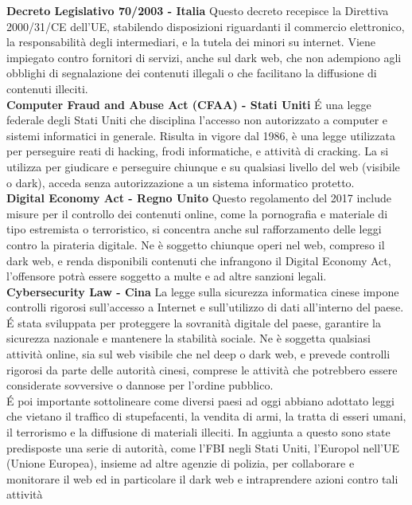 \textbf{Decreto Legislativo 70/2003 - Italia}
Questo decreto recepisce la Direttiva 2000/31/CE dell'UE, stabilendo disposizioni riguardanti il commercio elettronico, la responsabilità degli intermediari, e la tutela dei minori su internet.
Viene impiegato contro fornitori di servizi, anche sul dark web, che non adempiono agli obblighi di segnalazione dei contenuti illegali o che facilitano la diffusione di contenuti illeciti.\\

\textbf{Computer Fraud and Abuse Act (CFAA) - Stati Uniti}
\'E una legge federale degli Stati Uniti che disciplina l'accesso non autorizzato a computer e sistemi informatici in generale. Risulta in vigore dal 1986, è una legge utilizzata per perseguire reati di hacking, frodi informatiche, e attività di cracking.
La si utilizza per giudicare e perseguire chiunque e su qualsiasi livello del web (visibile o dark), acceda senza autorizzazione a un sistema informatico protetto.\\

\textbf{Digital Economy Act - Regno Unito}
Questo regolamento del 2017 include misure per il controllo dei contenuti online, come la pornografia e materiale di tipo estremista o terroristico, si concentra anche sul rafforzamento delle leggi contro la pirateria digitale.
Ne è soggetto chiunque operi nel web, compreso il dark web, e renda disponibili contenuti che infrangono il Digital Economy Act, l'offensore potrà essere soggetto a multe e ad altre sanzioni legali.\\

\textbf{Cybersecurity Law - Cina}
La legge sulla sicurezza informatica cinese impone controlli rigorosi sull'accesso a Internet e sull'utilizzo di dati all'interno del paese. \'E stata sviluppata per proteggere la sovranità digitale del paese, garantire la sicurezza nazionale e mantenere la stabilità sociale.
Ne è soggetta qualsiasi attività online, sia sul web visibile che nel deep o dark web, e prevede controlli rigorosi da parte delle autorità cinesi, comprese le attività che potrebbero essere considerate sovversive o dannose per l'ordine pubblico.\\

\'E poi importante sottolineare come diversi paesi ad oggi abbiano adottato leggi che vietano il traffico di stupefacenti, la vendita di armi, la tratta di esseri umani, il terrorismo e la diffusione di materiali illeciti.
In aggiunta a questo sono state predisposte una serie di autorità, come l'FBI negli Stati Uniti, l'Europol nell'UE (Unione Europea), insieme ad altre agenzie di polizia, per collaborare e monitorare il web ed in particolare il dark web e intraprendere azioni contro tali attività 


